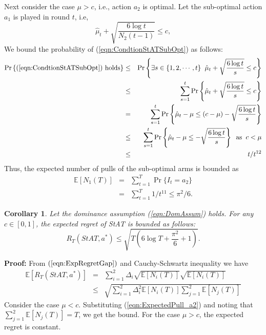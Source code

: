 \documentclass[draft, onecolumn, 12pt]{IEEEtran}
\newtheorem{corol}{Corollary}
\begin{document}
Next consider the case  $\mu> c $, i.e., action $a_2$ is optimal. Let the sub-optimal action $a_1$ is played in round $t$, i.e, 
\begin{equation}
\label{eqn:CondtionStATSubOpt}
\hat{\mu}_t+ \sqrt{\frac{6\log t}{N_2(t-1)}} \leq c,
\end{equation}
We bound the probability of (\ref{eqn:CondtionStATSubOpt}) as follows:
\begin{eqnarray}
\Pr\left \{\mbox{(\ref{eqn:CondtionStATSubOpt}) holds}\right \}&\leq& \Pr\left \{\exists s \in \{1,2,\cdots,t\}\;\; \hat{\mu}_t+ \sqrt{\frac{6\log t}{s}} \leq c \right \} \\
&\leq& \sum_{s=1}^t \Pr\left \{ \hat{\mu}_t+ \sqrt{\frac{6\log t}{s}} \leq c \right \} \\
&=& \sum_{s=1}^t \Pr\left \{ \hat{\mu}_t-\mu \leq (c-\mu)  -\sqrt{\frac{6\log t}{s}} \right \} \\
&\leq & \sum_{s=1}^t \Pr\left \{ \hat{\mu}_t-\mu \leq   -\sqrt{\frac{6\log t}{s}} \right \} \;\;\mbox{as}\;\; c<\mu \\
&\leq & t/t^{12} \\
\end{eqnarray}
Thus, the expected number of pulls of the sub-optimal arms is bounded as 
\begin{eqnarray}
\mathbb{E}[N_1(T)] &=&\sum_{t=1}^T \Pr\{I_t=a_2\}\\
&=& \sum_{t=1}^T 1/t^{11} \leq \pi^2/6.
\end{eqnarray}
\begin{corol}\label{corl:RegretStAT}
	Let the dominance assumption (\ref{eqn:DomAssum}) holds. For any $c \in [0,1]$, the expected regret of StAT is bounded as follows:
	\begin{equation}
	R_T(StAT,a^*)\leq \sqrt{T(6\log T + \frac{\pi^2}{6}+1)}.
	\end{equation}
\end{corol}
{\bf Proof:} From $(\ref{eqn:ExpRegretGap})$ and Cauchy-Schwartz inequality we have
\begin{eqnarray}
\mathbb{E}[R_T(StAT,a^*)] &=& \sum_{i=1}^2 \Delta_i \sqrt{\mathbb{E}[N_i(T)]} \sqrt{\mathbb{E}[N_i(T)]}\\
&\leq & \sqrt{\sum_{i=1}^2  \Delta_i^2 \mathbb{E}[N_i(T)]\sum_{j=1}^2 \mathbb{E}[N_j(T)] }
\end{eqnarray} 
Consider the case $\mu<c$. Substituting (\ref{eqn:ExpectedPull_a2}) and noting that $\sum_{j=1}^2 \mathbb{E}[N_j(T)]=T$, we get the bound. For the case $\mu>c$, the expected regret is constant. 
\end{document}

